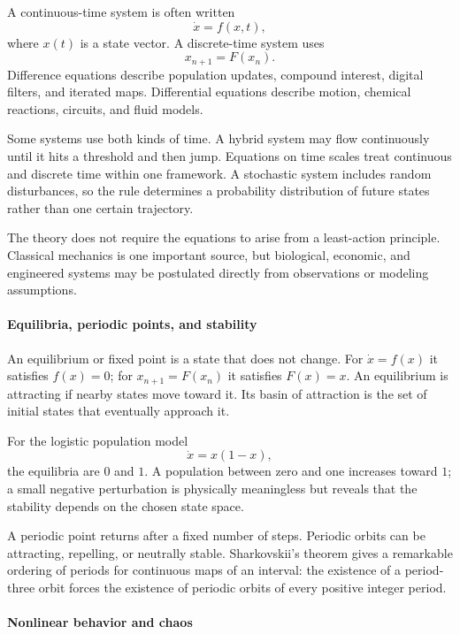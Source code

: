 A continuous-time system is often written
\[
 \dot x=f(x,t),
\]
where $x(t)$ is a state vector. A discrete-time system uses
\[
 x_{n+1}=F(x_n).
\]
Difference equations describe population updates, compound interest, digital filters, and iterated maps. Differential equations describe motion, chemical reactions, circuits, and fluid models.

Some systems use both kinds of time. A hybrid system may flow continuously until it hits a threshold and then jump. Equations on time scales treat continuous and discrete time within one framework. A stochastic system includes random disturbances, so the rule determines a probability distribution of future states rather than one certain trajectory.

The theory does not require the equations to arise from a least-action principle. Classical mechanics is one important source, but biological, economic, and engineered systems may be postulated directly from observations or modeling assumptions.

\paragraph{Equilibria, periodic points, and stability}

An equilibrium or fixed point is a state that does not change. For $\dot x=f(x)$ it satisfies $f(x)=0$; for $x_{n+1}=F(x_n)$ it satisfies $F(x)=x$. An equilibrium is attracting if nearby states move toward it. Its basin of attraction is the set of initial states that eventually approach it.

For the logistic population model
\[
 \dot x=x(1-x),
\]
the equilibria are $0$ and $1$. A population between zero and one increases toward $1$; a small negative perturbation is physically meaningless but reveals that the stability depends on the chosen state space.

A periodic point returns after a fixed number of steps. Periodic orbits can be attracting, repelling, or neutrally stable. Sharkovskii's theorem gives a remarkable ordering of periods for continuous maps of an interval: the existence of a period-three orbit forces the existence of periodic orbits of every positive integer period. \cite{dynamical_systems_theory_ref3}

\paragraph{Nonlinear behavior and chaos}

